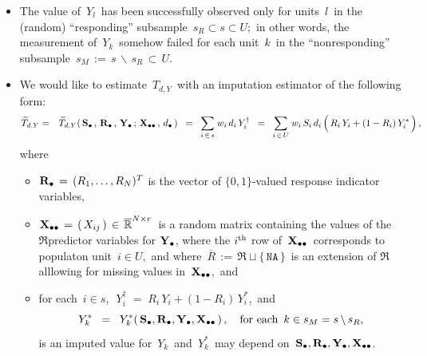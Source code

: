 \begin{itemize}
\begin{equation*}
    \end{equation*}
\item
    The value of \,$Y_{l}$\, has been successfully observed
    only for units \,$l$\, in the (random) ``responding'' subsample
    \,$s_{R} \subset s \subset U$;\,
    in other words, the measurement of \,$Y_{k}$\, somehow failed for each unit \,$k$\,
    in the ``nonresponding'' subsample
    \,$s_{M} \, := \,s \,\backslash\, s_{R} \,\subset\, U$.\,
\item
    We would like to estimate \,$T_{d,Y}$\,
    with an imputation estimator of the following form:
    \begin{eqnarray*}
    \widetilde{T}_{d,Y}
    & = &
        \widetilde{T}_{d,Y}(\,
            \Sdot\,,\,
            \Rdot\,,\,
            \Ydot\,;\,
            \Xdotdot\,,\,
            \dbullet
            \,)
    \;\; = \;\;
        \underset{i\,\in\,s}{\sum}\;w_{i}\,d_{i}\,Y^{\dagger}_{i}
    \;\; = \;\;
        \underset{i\,\in\,U}{\sum}\;w_{i}\,S_{i}\,d_{i}\left(\,
            R_{i}\,Y_{i}
            \overset{{\color{white}.}}{+}
            (1-R_{i})\,Y^{*}_{i}
            \,\right),
    \end{eqnarray*}
    where
    \begin{itemize}
    \item
        $\mathbf{R}_{\bullet} \,=\, (R_{1},\ldots,R_{N})^{T}$ is the vector of $\{0,1\}$-valued response indicator variables,
    \item
        $\mathbf{X}_{\bullet\bullet} \,=\, \left(\,X_{ij}\,\right) \,\in\, \overline{\mathbb{R}}^{N \times r}$\,
        is a random matrix containing the values of the $\Re$predictor variables for $\mathbf{Y}_{\bullet}$,
        where the $i^{\textnormal{th}}$ row of \,$\mathbf{X}_{\bullet\bullet}$\, corresponds to populaton unit \,$i \in U$,\,
        and where \,$\overline{R} \,:=\, \Re \sqcup \{\,\texttt{NA}\,\}$\,
        is an extension of $\Re$ alllowing for missing values in \,$\mathbf{X}_{\bullet\bullet}$,\, and
    \item
        for each \,$i \in s$,\,
        \,$Y^{\dagger}_{i} \;=\; R_{i}\,Y_{i}+(1-R_{i})\,Y^{*}_{i}$,\,
        and
        \begin{equation*}
        Y^{*}_{k}
        \;\; = \;\;
            Y^{*}_{k}(\,\mathbf{S}_{\bullet},\mathbf{R}_{\bullet},\mathbf{Y}_{\bullet},\mathbf{X}_{\bullet\bullet}\,)\,,
        \quad
        \textnormal{for each \,$k \in s_{M} = s\,\backslash\,s_{R}$},
        \end{equation*}
        is an imputed value for
        \,$Y_{k}$\, and \,$Y^{*}_{k}$\,
        may depend on
        \,$\mathbf{S}_{\bullet},\mathbf{R}_{\bullet},\mathbf{Y}_{\bullet},\mathbf{X}_{\bullet\bullet}$.\,
    \end{itemize}

\end{itemize}
